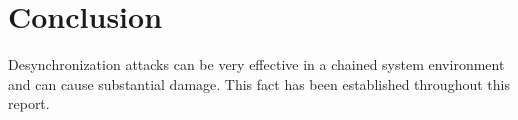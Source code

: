 \chapter{Conclusion}
Desynchronization attacks can be very effective in a chained system environment and can cause substantial damage. This fact has been established throughout this report. 